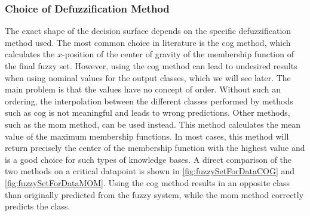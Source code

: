 \subsubsection{Choice of Defuzzification Method}

The exact shape of the decision surface depends on the specific defuzzification method used. The most common choice in literature is the \gls{cog} method, which calculates the $x$-position of the center of gravity of the membership function of the final fuzzy set.
However, using the \gls{cog} method can lead to undesired results when using nominal values for the output classes, which we will see later. The main problem is that the values have no concept of order. Without such an ordering, the interpolation between the different classes performed by methods such as \gls{cog} is not meaningful and leads to wrong predictions. Other methods, such as the \gls{mom} method, can be used instead. This method calculates the mean value of the maximum membership functions. In most cases, this method will return precisely the center of the membership function with the highest value and is a good choice for such types of knowledge bases. A direct comparison of the two methods on a critical datapoint is shown in \autoref{fig:fuzzySetForDataCOG} and \autoref{fig:fuzzySetForDataMOM}. Using the \gls{cog} method results in an opposite class than originally predicted from the fuzzy system, while the \gls{mom} method correctly predicts the class.


